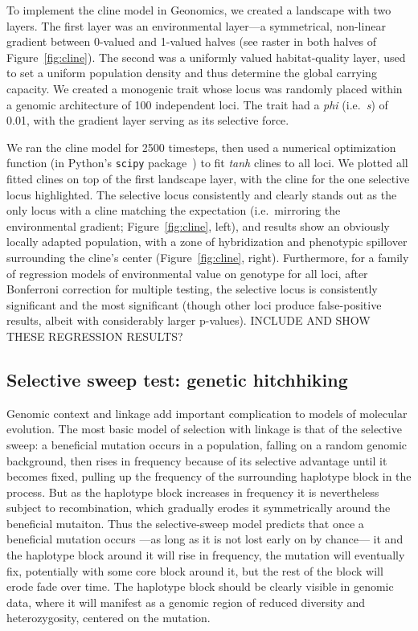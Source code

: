 ﻿\documentclass{article}
\begin{document}
To implement the cline model in Geonomics, we created a landscape with two layers.
The first layer was an environmental layer---a symmetrical, non-linear gradient
between 0-valued and 1-valued halves (see raster in both halves of Figure~\ref{fig:cline}).
The second was a uniformly valued habitat-quality layer, used to set a uniform
population density and thus determine the global carrying capacity.
We created a monogenic trait whose locus was randomly placed within a
genomic architecture of 100 independent loci.
The trait had a \emph{phi} (i.e.\ \emph{s}) of 0.01,
with the gradient layer serving as its selective force.

We ran the cline model for 2500 timesteps, then used a numerical optimization function
(in Python's \texttt{scipy} package~\cite{scipy}) to fit \emph{tanh} clines to all loci.
We plotted all fitted clines on top of the first landscape layer,
with the cline for the one selective locus highlighted.
The selective locus consistently and clearly stands out as the only locus with a cline
matching the expectation (i.e.\ mirroring the environmental gradient; Figure~\ref{fig:cline}, left),
and results show an obviously locally adapted population, with a zone of hybridization
and phenotypic spillover surrounding the cline's center (Figure~\ref{fig:cline}, right).
Furthermore, for a family of regression models of environmental value
on genotype for all loci, after Bonferroni correction for multiple testing,
the selective locus is consistently significant and the most significant 
(though other loci produce false-positive results, albeit with considerably larger p-values).
INCLUDE AND SHOW THESE REGRESSION RESULTS?


\subsection{Selective sweep test: genetic hitchhiking}
Genomic context and linkage add important complication to models of molecular evolution.
The most basic model of selection with linkage is that of the selective sweep:
a beneficial mutation occurs in a population, falling on a random genomic background,
then rises in frequency because of its selective advantage until it becomes fixed,
pulling up the frequency of the surrounding haplotype block in the process.
But as the haplotype block increases in frequency it is nevertheless subject to recombination,
which gradually erodes it symmetrically around the beneficial mutaiton.
Thus the selective-sweep model predicts that once a beneficial mutation occurs
---as long as it is not lost early on by chance---
it and the haplotype block around it will rise in frequency,
the mutation will eventually fix, potentially with some core block around it,
but the rest of the block will erode fade over time.
The haplotype block should be clearly visible in genomic data,
where it will manifest as a genomic region of reduced diversity and heterozygosity,
centered on the mutation.
\end{document}
